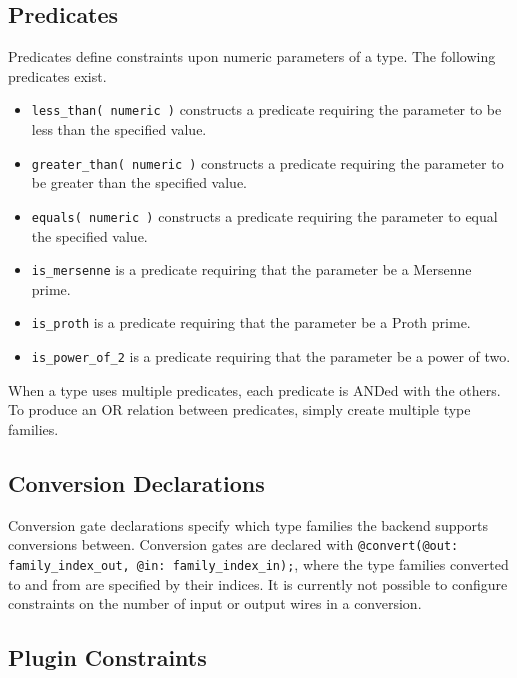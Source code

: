 \subsection{Predicates}\label{sec:predicates}

Predicates define constraints upon numeric parameters of a type.
The following predicates exist.

\begin{itemize}
  \item \texttt{less\_than( numeric )} constructs a predicate requiring the parameter to be less than the specified value.
  \item \texttt{greater\_than( numeric )} constructs a predicate requiring the parameter to be greater than the specified value.
  \item \texttt{equals( numeric )} constructs a predicate requiring the parameter to equal the specified value.
  \item \texttt{is\_mersenne} is a predicate requiring that the parameter be a Mersenne prime.
  \item \texttt{is\_proth} is a predicate requiring that the parameter be a Proth prime.
  \item \texttt{is\_power\_of\_2} is a predicate requiring that the parameter be a power of two.
\end{itemize}

When a type uses multiple predicates, each predicate is ANDed with the others.
To produce an OR relation between predicates, simply create multiple type families.

\subsection{Conversion Declarations}\label{sec:ccc_conv_decl}

Conversion gate declarations specify which type families the backend supports conversions between.
Conversion gates are declared with \texttt{@convert(@out: family\_index\_out, @in: family\_index\_in);}, where the type families converted to and from are specified by their indices.
It is currently not possible to configure constraints on the number of input or output wires in a conversion.
% 

\subsection{Plugin Constraints}\label{sec:plugin_constraints}

